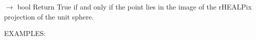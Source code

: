 \documentclass[a4paper,12ptopenany,oneside,english]{sphinxmanual}
\begin{document}
\begin{fulllineitems}
\label{\detokenize{pj_rhealpix:rhealpixdggs.pj_rhealpix.in_rhealpix_image}}
\pysigstartsignatures
\pysiglinewithargsret
{}
{\sphinxparamcomma {}\sphinxparamcomma {}\sphinxparamcomma {}}
{{ $\rightarrow$ bool}}
\pysigstopsignatures
\sphinxAtStartPar
Return True if and only if the point  lies in the image of
the rHEALPix projection of the unit sphere.

\sphinxAtStartPar
EXAMPLES:


\end{fulllineitems}
\end{document}
